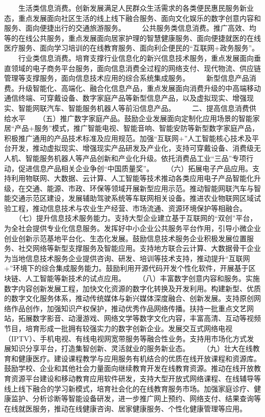 \documentclass[11pt]{ctexart}
\begin{document}
{{{{　　生活类信息消费。创新发展满足人民群众生活需求的各类便民惠民服务新业态，重点发展面向社区生活的线上线下融合服务、面向文化娱乐的数字创意内容和服务、面向便捷出行的交通旅游服务。
　　公共服务类信息消费。推广高效、均等的在线公共服务，重点发展面向居家护理的智慧健康服务、面向便捷就医的在线医疗服务、面向学习培训的在线教育服务、面向利企便民的“互联网+政务服务”。
　　行业类信息消费。培育支撑行业信息化的新兴信息技术服务，重点发展面向垂直领域的电子商务平台服务，面向信息消费全过程的网络支付、现代物流、供应链管理等支撑服务，面向信息技术应用的综合系统集成服务。
　　新型信息产品消费。升级智能化、高端化、融合化信息产品，重点发展面向消费升级的中高端移动通信终端、可穿戴设备、数字家庭产品等新型信息产品，以及虚拟现实、增强现实、智能网联汽车、智能服务机器人等前沿信息产品。
　　二、提高信息消费供给水平
　　（五）推广数字家庭产品。鼓励企业发展面向定制化应用场景的智能家居“产品+服务”模式，推广智能电视、智能音响、智能安防等新型数字家庭产品，积极推广通用的产品技术标准及应用规范。加强“互联网+”人工智能核心技术及平台开发，推动虚拟现实、增强现实产品研发及产业化，支持可穿戴设备、消费级无人机、智能服务机器人等产品创新和产业化升级。依托消费品工业“三品”专项行动，促进信息产品相关企业争创“中国质量奖”。
　　（六）拓展电子产品应用。支持利用物联网、大数据、云计算、人工智能等技术推动各类应用电子产品智能化升级，在交通、能源、市政、环保等领域开展新型应用示范。推动智能网联汽车与智能交通示范区建设，发展辅助驾驶系统等车联网相关设备。推进农业物联网区域试验工程，推动信息技术与农业生产经营、市场流通、资源环境保护等相融合。
　　（七）提升信息技术服务能力。支持大型企业建立基于互联网的“双创”平台，为全社会提供专业化信息服务。发挥好中小企业公共服务平台作用，引导小微企业创业创新示范基地平台化、生态化发展。鼓励信息技术服务企业积极发展位置服务、社交网络等新型支撑服务及智能应用。支持地方联合云计算、大数据骨干企业为当地信息技术服务企业提供咨询、研发、培训等技术支持，推动提升“互联网+”环境下的综合集成服务能力。鼓励利用开源代码开发个性化软件，开展基于区块链、人工智能等新技术的试点应用。
　　（八）丰富数字创意内容和服务。实施数字内容创新发展工程，加快文化资源的数字化转换及开发利用。构建新型、优质的数字文化服务体系，推动传统媒体与新兴媒体深度融合、创新发展。支持原创网络作品创作，加强知识产权保护，推动优秀作品网络传播。扶持一批重点文艺网站，拓展数字影音、动漫游戏、网络文学等数字文化内容，丰富高清、互动等视频节目，培育形成一批拥有较强实力的数字创新企业。发展交互式网络电视（IPTV）、手机电视、有线电视网宽带服务等融合性业务。支持用市场化方式发展知识分享平台，打造集智创新、灵活就业的服务新业态。
　　（九）壮大在线教育和健康医疗。建设课程教学与应用服务有机结合的优质在线开放课程和资源库。鼓励学校、企业和其他社会力量面向继续教育开发在线教育资源。推动在线开放教育资源平台建设和移动教育应用软件研发，支持大型开放式网络课程、在线辅导等线上线下融合的学习新模式，培育社会化的在线教育服务市场。加强家庭诊疗、健康监护、分析诊断等智能设备研发，进一步推广网上预约、网络支付、结果查询等在线就医服务，推动在线健康咨询、居家健康服务、个性化健康管理等应用。
}}}}
\end{document}
